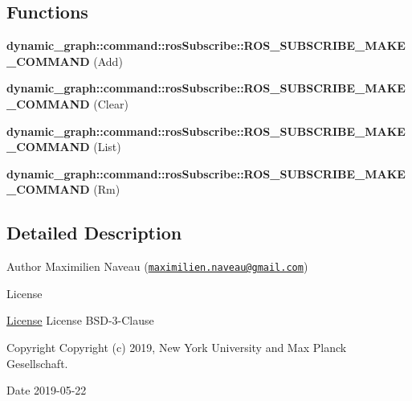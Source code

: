 \subsection*{Functions}
\begin{DoxyCompactItemize}
\item 
{\bfseries dynamic\+\_\+graph\+::command\+::ros\+Subscribe\+::\+R\+O\+S\+\_\+\+S\+U\+B\+S\+C\+R\+I\+B\+E\+\_\+\+M\+A\+K\+E\+\_\+\+C\+O\+M\+M\+A\+ND} (Add)\hypertarget{ros__subscribe_8hh_a851d0a5a8fb99787dac07721efad1749}{}\label{ros__subscribe_8hh_a851d0a5a8fb99787dac07721efad1749}

\item 
{\bfseries dynamic\+\_\+graph\+::command\+::ros\+Subscribe\+::\+R\+O\+S\+\_\+\+S\+U\+B\+S\+C\+R\+I\+B\+E\+\_\+\+M\+A\+K\+E\+\_\+\+C\+O\+M\+M\+A\+ND} (Clear)\hypertarget{ros__subscribe_8hh_a9cd291bd1bf5d3ebbda624311439f01c}{}\label{ros__subscribe_8hh_a9cd291bd1bf5d3ebbda624311439f01c}

\item 
{\bfseries dynamic\+\_\+graph\+::command\+::ros\+Subscribe\+::\+R\+O\+S\+\_\+\+S\+U\+B\+S\+C\+R\+I\+B\+E\+\_\+\+M\+A\+K\+E\+\_\+\+C\+O\+M\+M\+A\+ND} (List)\hypertarget{ros__subscribe_8hh_a9538860561adf4e2f36cbf232bd4cdab}{}\label{ros__subscribe_8hh_a9538860561adf4e2f36cbf232bd4cdab}

\item 
{\bfseries dynamic\+\_\+graph\+::command\+::ros\+Subscribe\+::\+R\+O\+S\+\_\+\+S\+U\+B\+S\+C\+R\+I\+B\+E\+\_\+\+M\+A\+K\+E\+\_\+\+C\+O\+M\+M\+A\+ND} (Rm)\hypertarget{ros__subscribe_8hh_af552c361a9ea2c6a0059a8f85b1d6842}{}\label{ros__subscribe_8hh_af552c361a9ea2c6a0059a8f85b1d6842}

\end{DoxyCompactItemize}


\subsection{Detailed Description}
\begin{DoxyAuthor}{Author}
Maximilien Naveau (\href{mailto:maximilien.naveau@gmail.com}{\tt maximilien.\+naveau@gmail.\+com}) 
\end{DoxyAuthor}
\begin{DoxyRefDesc}{License}
\item[\hyperlink{license__license000027}{License}]License B\+S\+D-\/3-\/\+Clause \end{DoxyRefDesc}
\begin{DoxyCopyright}{Copyright}
Copyright (c) 2019, New York University and Max Planck Gesellschaft. 
\end{DoxyCopyright}
\begin{DoxyDate}{Date}
2019-\/05-\/22 
\end{DoxyDate}


